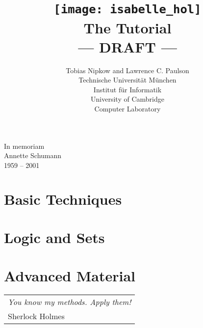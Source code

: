\documentclass{article}
\begin{document}
\title{\texttt{[image: isabelle\_hol]}
       \\ \vspace{0.5cm} The Tutorial
       \\ --- DRAFT ---}
\author{Tobias Nipkow and Lawrence C. Paulson\\[1ex]
Technische Universit{\"a}t M{\"u}nchen \\
Institut f{\"u}r Informatik \\[1ex]
University of Cambridge\\
Computer Laboratory}
\maketitle

\setcounter{page}{5}
\vspace*{\fill}
\begin{center}
\LARGE In memoriam \\[1ex]
{\sc Annette Schumann}\\[1ex]
1959 -- 2001
\end{center}
\vspace*{\fill}
\vspace*{\fill}
\newpage


\tableofcontents

\cleardoublepage{}

\part{Basic Techniques}  %



\part{Logic and Sets}



\part{Advanced Material}




\markboth{}{}
\cleardoublepage
\vspace*{\fill}
\begin{flushright}
\begin{tabular}{l}
{\large\sf\slshape You know my methods. Apply them!}\\[1ex]
Sherlock Holmes
\end{tabular}
\end{flushright}
\vspace*{\fill}
\vspace*{\fill}





\printindex
\end{document}
